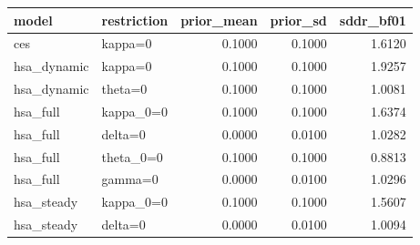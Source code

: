 \begin{tabular}{llrrr}
\toprule
model & restriction & prior\_mean & prior\_sd & sddr\_bf01 \\
\midrule
ces & kappa=0 & 0.1000 & 0.1000 & 1.6120 \\
hsa\_dynamic & kappa=0 & 0.1000 & 0.1000 & 1.9257 \\
hsa\_dynamic & theta=0 & 0.1000 & 0.1000 & 1.0081 \\
hsa\_full & kappa\_0=0 & 0.1000 & 0.1000 & 1.6374 \\
hsa\_full & delta=0 & 0.0000 & 0.0100 & 1.0282 \\
hsa\_full & theta\_0=0 & 0.1000 & 0.1000 & 0.8813 \\
hsa\_full & gamma=0 & 0.0000 & 0.0100 & 1.0296 \\
hsa\_steady & kappa\_0=0 & 0.1000 & 0.1000 & 1.5607 \\
hsa\_steady & delta=0 & 0.0000 & 0.0100 & 1.0094 \\
\bottomrule
\end{tabular}
